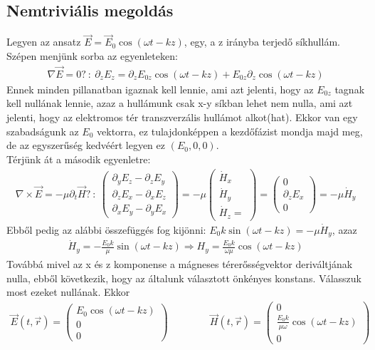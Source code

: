 \documentclass{article}
\begin{document}
\subsection{Nemtriviális megoldás}
Legyen az ansatz $\vec{E} = \vec{E}_0 \cos(\omega t - k z)$, egy, a z irányba terjedő síkhullám. Szépen menjünk sorba az egyenleteken:
\begin{align*}
\nabla \vec{E} = 0? \ : \ \partial_z E_z = \partial_z E_{0z} \cos(\omega t - kz) + E_{0z} \partial_z \cos(\omega t  -kz) 
\end{align*}
Ennek minden pillanatban igaznak kell lennie, ami azt jelenti, hogy az $E_{0z}$ tagnak kell nullának lennie, azaz a hullámunk csak x-y síkban lehet nem nulla, ami azt jelenti, hogy az elektromos tér transzverzális hullámot alkot(hat). Ekkor van egy szabadságunk az $E_0$ vektorra, ez tulajdonképpen a kezdőfázist mondja majd meg, de az egyszerűség kedvéért legyen ez $(E_0, 0, 0)$. \\
Térjünk át a második egyenletre:
\begin{align*}
\nabla \times \vec{E} = -\mu \partial_t \vec{H}? \ : \
\begin{pmatrix}
\partial_y E_z - \partial_z E_y \\
\partial_z E_x - \partial_x E_z \\
\partial_x E_y - \partial_y E_x 
\end{pmatrix}  = -\mu 
\begin{pmatrix}
\dot{H}_x \\ \dot{H}_y  \\ \dot{H}_z = 
\end{pmatrix}=
\begin{pmatrix}
0 \\ \partial_z E_x \\ 0
\end{pmatrix} = -\mu \dot{H}_y
\end{align*}
Ebből pedig az alábbi összefüggés fog kijönni: $E_0 k \sin(\omega t - k z) = -\mu \dot{H}_y$, azaz 
\begin{align*}
\dot{H}_y = -\frac{E_0 k }{\mu} \sin(\omega  t - kz) \Rightarrow H_y = \frac{E_0 k }{\omega \mu} \cos(\omega t - kz)
\end{align*}
Továbbá mivel az x és z komponense a mágneses térerősségvektor deriváltjának nulla, ebből következik, hogy az általunk választott önkényes konstans. Válasszuk most ezeket nullának. Ekkor
\begin{align*}
\vec{E}(t,\vec{r}) = \begin{pmatrix}
E_0 \cos(\omega t -kz) \\ 0 \\ 0
\end{pmatrix} \hspace{50pt}
\vec{H}(t,\vec{r}) = \begin{pmatrix}
0 \\ \frac{E_0 k}{\mu \omega} \cos(\omega t -kz) \\ 0
\end{pmatrix}
\end{align*}
\end{document}
